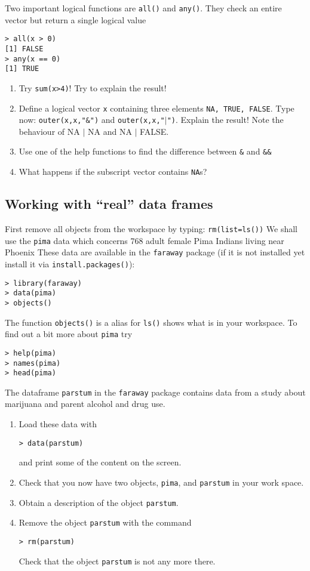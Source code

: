 \documentclass[12pt]{article}
\begin{document}
Two important logical functions are \texttt{all()} and \texttt{any()}. They check an entire vector but return
a single logical value
\begin{verbatim}
> all(x > 0)
[1] FALSE
> any(x == 0)
[1] TRUE
\end{verbatim}

\begin{enumerate}
\item Try \texttt{sum(x>4)}! Try to explain the result!
\item Define a logical vector \texttt{x} containing three elements \texttt{NA, TRUE, FALSE}. Type now: \texttt{outer(x,x,"\&")} and \texttt{outer(x,x,"$|$")}. Explain the result!  Note the behaviour of NA $|$ NA and NA $|$ FALSE.
\item Use one of the help functions to find the difference between \texttt{\&} and \texttt{\&\&}
\item What happens if the subscript vector contains \texttt{NA}s?
\end{enumerate}

\subsection{Working with “real” data frames}

First remove all objects from the workspace by typing: \texttt{rm(list=ls())} 
We shall use the \texttt{pima} data which concerns 768 adult female Pima Indians living near Phoenix
These data are available in the \texttt{faraway} package (if it is not installed yet install it via \texttt{install.packages()}):
\begin{verbatim}
> library(faraway)
> data(pima)
> objects()
\end{verbatim}
The function \texttt{objects()} is a alias for \texttt{ls()} shows what is in your workspace. To find out a bit more about \texttt{pima} try
\begin{verbatim}
> help(pima)
> names(pima)
> head(pima)
\end{verbatim}

The dataframe \texttt{parstum} in the \texttt{faraway} package contains data from a study about marijuana and parent alcohol and drug use. 
\begin{enumerate}
\item Load these data with
\begin{verbatim}
> data(parstum)
\end{verbatim}
and print some of the content on the screen.
\item Check that you now have two objects, \texttt{pima}, and \texttt{parstum} in your work space.
\item Obtain a description of the object \texttt{parstum}.
\item Remove the object \texttt{parstum} with the command
\begin{verbatim}
> rm(parstum)
\end{verbatim}
Check that the object \texttt{parstum} is not any more there.
\end{enumerate}
\end{document}
